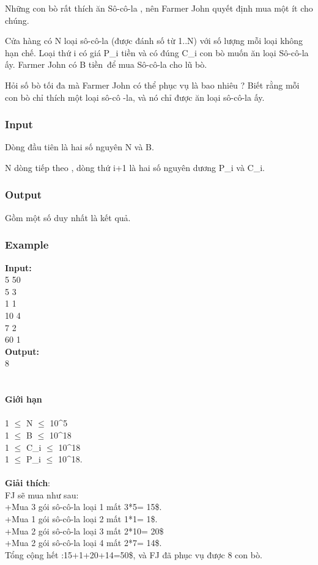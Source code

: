 

Những con bò rất thích ăn Sô-cô-la , nên Farmer John quyết định mua một ít cho chúng.

Cửa hàng có N loại sô-cô-la (được đánh số từ 1..N) với số lượng mỗi loại không hạn chế. Loại thứ i có giá P\_i tiền và có đúng C\_i con bò muốn ăn loại Sô-cô-la ấy. Farmer John có B tiền để mua Sô-cô-la cho lũ bò.

Hỏi số bò tối đa mà Farmer John có thể phục vụ là bao nhiêu ? Biết rằng mỗi con bò chỉ thích một loại sô-cô -la, và nó chỉ được ăn loại sô-cô-la ấy.

\subsubsection{Input}

Dòng đầu tiên là hai số nguyên N và B.

N dòng tiếp theo , dòng thứ i+1 là hai số nguyên dương P\_i và C\_i.

\subsubsection{Output}

Gồm một số duy nhất là kết quả.

\subsubsection{Example}

\textbf{Input:}
\\5 50
\\5 3
\\1 1
\\10 4
\\7 2
\\60 1
\\\textbf{Output:}
\\8
\\
\\
\\\textbf{​Giới hạn}
\\
\\1 $\le$ N $\le$ 10^5
\\1  $\le$  B  $\le$  10^18
\\1  $\le$  C\_i  $\le$  10^18
\\1  $\le$  P\_i  $\le$  10^18.
\\
\\\textbf{Giải thích}:
\\FJ sẽ mua như sau:
\\+Mua 3 gói sô-cô-la loại 1 mất 3*5= 15\$.
\\+Mua 1 gói sô-cô-la loại 2 mất 1*1= 1\$.
\\+Mua 2 gói sô-cô-la loại 3 mất 2*10= 20\$
\\+Mua 2 gói sô-cô-la loại 4 mất 2*7= 14\$.
\\Tổng cộng hết :15+1+20+14=50\$, và FJ đã phục vụ được 8 con bò.

 

 
